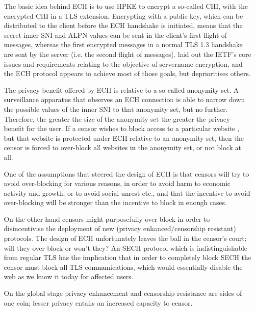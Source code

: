 
The basic idea behind \ac{ECH} is to use \ac{HPKE} to encrypt a so-called \ac{CHI},
with the encrypted \ac{CHI} in a \ac{TLS} extension.
Encrypting with a public key, which can be distributed to the client before the \ac{ECH} handshake is initiated,
means that the secret inner \ac{SNI} and \ac{ALPN} values can be sent in the client's
first flight of messages, whereas the first encrypted messages in a normal \ac{TLS} 1.3 handshake
are sent by the server (i.e. the second flight of messages).
\cite{rfc8744-issues} laid out the \ac{IETF}'s core issues and requirements relating to the
objective of servername encryption,
and the \ac{ECH} protocol appears to achieve most of those goals,
but deprioritises others.

The privacy-benefit offered by \ac{ECH} is relative to a so-called anonymity set.
A surveillance apparatus that observes an \ac{ECH} connection is able to narrow down the possible
values of the inner \ac{SNI} to that anonymity set, but no further.
Therefore, the greater the size of the anonymity set
the greater the privacy-benefit for the user.
If a censor wishes to block access to a particular website ,
but that website is protected under \ac{ECH} relative to an anonymity set,
then the censor is forced to over-block all websites in the anonymity set,
or not block  at all.

One of the assumptions that steered the design of \ac{ECH} is that
censors will try to avoid over-blocking for various reasons,
in order to avoid harm to economic activity and growth,
or to avoid social unrest etc., and that the incentive
to avoid over-blocking will be stronger than the incentive to block in enough cases.

On the other hand censors might purposefully over-block in order to disincentivise the deployment of new (privacy enhanced/censorship resistant) protocols.
The design of \ac{ECH} unfortunately leaves the ball in the censor's court;
will they over-block or won't they?
An \ac{SECH} protocol which is indistinguishable from
regular \ac{TLS} has the implication that in order
to completely block \ac{SECH} the censor must
block all \ac{TLS} communications,
which would essentially disable the web as we know it today
for affected users.

On the global stage privacy enhancement and censorship resistance are sides of one coin;
lesser privacy entails an increased capacity to censor.

